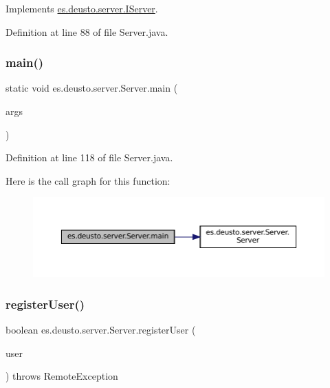 Implements \mbox{\hyperlink{interfacees_1_1deusto_1_1server_1_1_i_server_a479231082cae13f9c651c0ec2cb2cece}{es.\+deusto.\+server.\+I\+Server}}.



Definition at line 88 of file Server.\+java.

\mbox{\label{classes_1_1deusto_1_1server_1_1_server_a750bb0d7dbd89246a3602f2e20d03fb5}} 
\subsubsection{\texorpdfstring{main()}{main()}}
{\footnotesize\ttfamily static void es.\+deusto.\+server.\+Server.\+main (\begin{DoxyParamCaption}\item[{String \mbox{[}$\,$\mbox{]}}]{args }\end{DoxyParamCaption})\hspace{0.3cm}{\ttfamily [static]}}



Definition at line 118 of file Server.\+java.

Here is the call graph for this function\+:
\nopagebreak
\begin{figure}[H]
\begin{center}
\leavevmode
\includegraphics[width=350pt]{classes_1_1deusto_1_1server_1_1_server_a750bb0d7dbd89246a3602f2e20d03fb5_cgraph}
\end{center}
\end{figure}
\mbox{\label{classes_1_1deusto_1_1server_1_1_server_a6a419bd82bce60f072b4c7f5a527abdc}} 
\subsubsection{\texorpdfstring{registerUser()}{registerUser()}}
{\footnotesize\ttfamily boolean es.\+deusto.\+server.\+Server.\+register\+User (\begin{DoxyParamCaption}\item[{\mbox{\hyperlink{classes_1_1deusto_1_1server_1_1data_1_1_user_details_d_t_o}{User\+Details\+D\+TO}}}]{user }\end{DoxyParamCaption}) throws Remote\+Exception}



